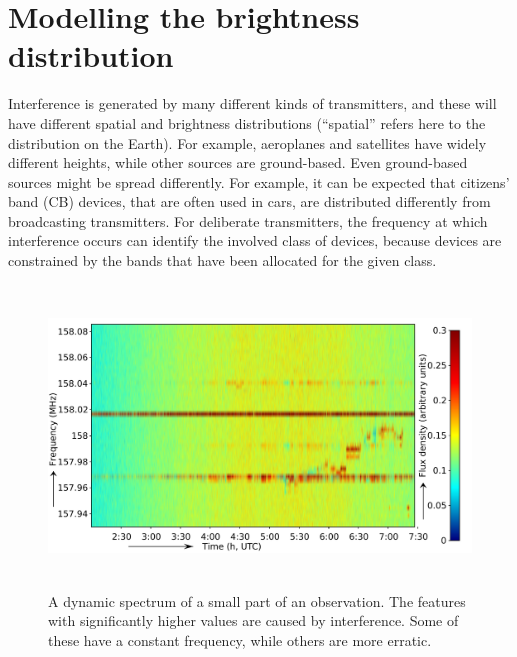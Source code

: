 \documentclass[useAMS,usenatbib]{mn2e}
\begin{document}
\section{Modelling the brightness distribution} \label{sec:distribution-prediction}
Interference is generated by many different kinds of transmitters, and these will have different spatial and brightness distributions (``spatial'' refers here to the distribution on the Earth). For example, aeroplanes and satellites have widely different heights, while other sources are ground-based. Even ground-based sources might be spread differently. For example, it can be expected that citizens' band (CB) devices, that are often used in cars, are distributed differently from broadcasting transmitters. For deliberate transmitters, the frequency at which interference occurs can identify the involved class of devices, because devices are constrained by the bands that have been allocated for the given class.

\begin{figure}
\begin{center}
\includegraphics[height=8cm]{img/TF-L43786_L220-rfi-example-xaxistext.pdf}
\caption{A dynamic spectrum of a small part of an observation. The features with significantly higher values are caused by interference. Some of these have a constant frequency, while others are more erratic.}
\label{fig:dist-rfi-example}
\end{center}
\end{figure}
\end{document}

